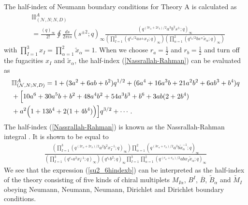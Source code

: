 \documentclass[12pt]{article}
\newcommand{\II}{\mathbb{II}}
\numberwithin{equation}{section}
\begin{document}
The half-index of Neumann boundary conditions for Theory A is calculated as
\begin{align}
\label{Nassrallah-Rahman}
&
\II_{(\mathcal{N},N;N,D)}^A
\nonumber\\
&=
\frac{(q)_{\infty}}{2!} \oint \frac{ds}{2\pi i s}
(s^{\pm 2}; q)_{\infty}
\frac{(q^{(3r_a + 2r_b)/2} a^3 b^2 s^{\pm}; q)_{\infty}}{\left( \prod_{I = 1}^3 (q^{r_a/2} a s^{\pm} x_{I}; q)_{\infty} \right) \left( \prod_{\alpha = 1}^2 (q^{r_b/2} b s^{\mp} \tilde{x}_{\alpha}; q)_{\infty} \right)}
\end{align}
with $\prod_{I = 1}^3 x_I = \prod_{\alpha = 1}^2 \tilde{x}_{\alpha} = 1$.
When we choose $r_a=\frac12$ and $r_b=\frac12$ 
and turn off the fugacities $x_{I}$ and $\tilde{x}_{\alpha}$, 
the half-index (\ref{Nassrallah-Rahman}) can be evaluated as
\begin{align}
&
\II_{(\mathcal{N},N;N,D)}^A
=1+(3a^2+6ab+b^2)q^{1/2}
+(6a^4+16a^3b+21a^2b^2+6ab^3+b^4)q
\nonumber\\
&+\Bigl[
10a^6+30 a^5 b+b^2+48a^4 b^2+54 a^3 b^3+b^6
+3ab(2+2b^4)
\nonumber\\
&+a^2\Bigl(1+13b^4+2 (1 + 4 b^4)\Bigr)
\Bigr]q^{3/2}+\cdots. 
\end{align}
The half-index (\ref{Nassrallah-Rahman}) is known as 
the Nassrallah-Rahman integral \cite{MR772878,MR845667}. 
It is shown to be equal to
\begin{align}
\label{su2_6hindexb}
\frac{\left( \prod_{I = 1}^3 \left( q^{(2r_a + 2r_b)/2} a^2 b^2 x_I^{-1}; q \right)_{\infty} \right) \prod_{\alpha = 1}^2 (q^{(3r_a + r_b)/2} a^3 b \tilde{x}_{\alpha}^{-1}; q)_{\infty}}{\left( \prod_{I = 1}^3 \left( q^{r_a} a^2 x_I^{-1}; q \right)_{\infty} \right) \left( q^{r_b} b^2; q \right)_{\infty} \prod_{I = 1}^3 \prod_{\alpha = 1}^2 (q^{(r_a + r_b)/2} ab x_I \tilde{x}_{\alpha}; q)_{\infty}}
\end{align}
We see that 
the expression (\ref{su2_6hindexb}) can be interpreted as 
the half-index of the theory consisting of five kinds of chiral multiplets 
$M_{I\alpha}$, $B^I$, $\overline{B}$, $\widetilde{B}_{\alpha}$ and $\widetilde{M}_I$ 
obeying Neumann, Neumann, Neumann, Dirichlet and Dirichlet boundary conditions. 
\end{document}
